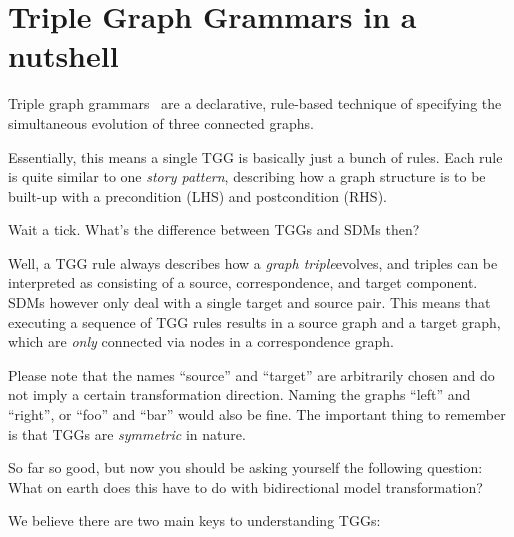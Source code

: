 \section{Triple Graph Grammars in a nutshell}
\genHeader

Triple graph grammars~\cite{tgg:schuerr_94,sk2008,Klar2010} are a declarative, rule-based technique of specifying the simultaneous evolution of three connected
graphs. 

Essentially, this means a single TGG is basically just a bunch of rules. Each rule is quite similar to one \emph{story pattern}, describing how a graph
structure is to be built-up with a precondition (LHS) and postcondition (RHS). 

Wait a tick. What's the difference between TGGs and SDMs then?

Well, a TGG rule always describes how a \emph{graph triple}evolves, and triples can be interpreted as consisting of a source,
correspondence, and target component. SDMs however only deal with a single target and source pair. This means that executing a sequence of TGG rules results in
a source graph and a target graph, which are \emph{only} connected via nodes in a correspondence graph. 

Please note that the names ``source'' and ``target'' are arbitrarily chosen and do not imply a certain transformation direction. Naming the graphs ``left'' and ``right'', or ``foo'' and ``bar'' would also be fine. The
important thing to remember is that TGGs are \emph{symmetric} in nature.

So far so good, but now you should be asking yourself the following question: What on earth does this have to do with bidirectional model transformation?

We believe there are two main keys to understanding TGGs:

